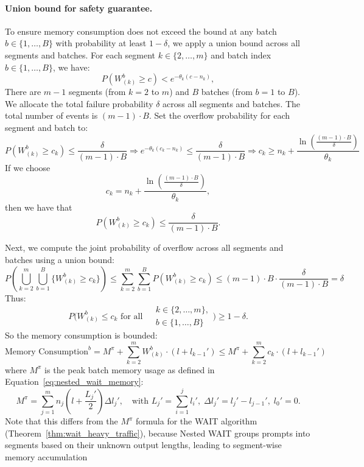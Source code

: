 \paragraph{Union bound for safety guarantee.}
To ensure memory consumption does not exceed the bound at any batch $b \in \{1, \dots, B\}$ with probability at least \( 1 - \delta \), we apply a union bound across all segments and batches. For each segment \( k \in \{2, \dots, m\} \) and batch index \( b \in \{1, \dots, B\} \), we have:
\[ P\left( W^b_{(k)} \geq c \right) < e^{-\theta_k (c - n_k)}, \]
There are \( m - 1 \) segments (from \( k = 2 \) to \( m \)) and \( B \) batches (from \( b = 1 \) to \( B \)). We allocate the total failure probability \( \delta \) across all segments and batches. The total number of events is \( (m - 1) \cdot B \). Set the overflow probability for each segment and batch to:
$$P\left( W^b_{(k)} \geq c_k \right) \leq \frac{\delta}{(m - 1) \cdot B}\Rightarrow e^{-\theta_k (c_k - n_k)} \leq \frac{\delta}{(m - 1) \cdot B}\Rightarrow c_k \geq n_k + \frac{\ln\left( \frac{(m - 1) \cdot B}{\delta} \right)}{\theta_k}$$
If we choose
\[ c_k = n_k + \frac{\ln\left( \frac{(m - 1) \cdot B}{\delta} \right)}{\theta_k}, \]
then we have that
\[ P\left( W^b_{(k)} \geq c_k \right) \leq \frac{\delta}{(m - 1) \cdot B}. \]

Next, we compute the joint probability of overflow across all segments and batches using a union bound:
$$P\left( \bigcup_{k=2}^m \bigcup_{b=1}^B \{ W^b_{(k)} \geq c_k \} \right) \leq \sum_{k=2}^m \sum_{b=1}^B P\left( W^b_{(k)} \geq c_k \right)\leq (m - 1) \cdot B \cdot \frac{\delta}{(m - 1) \cdot B} = \delta$$
Thus:
$$P\bigg( W^b_{(k)} \leq c_k \text{ for all }
\begin{aligned}
    &k \in \{2, \dots, m\}, \\
    &b \in \{1, \dots, B\}
\end{aligned} \bigg)
\geq 1 - \delta.$$
So the memory consumption is bounded:
$$    \text{Memory Consumption}^b
= M^{\pi} + \sum_{k=2}^m W^b_{(k)} \cdot (l + l_{k-1}')\leq M^{\pi} + \sum_{k=2}^m c_k \cdot (l + l_{k-1}')$$
where $M^\pi$ is the peak batch memory usage as defined in Equation~\eqref{eq:nested_wait_memory}:
$$M^\pi = \sum_{j=1}^m n_j \left( l + \frac{L_j'}{2} \right) \Delta l_j', \quad \text{with } L_j' = \sum_{i=1}^j l_i',\; \Delta l_j' = l_j' - l_{j-1}',\; l_0' = 0.$$
Note that this differs from the $M^\pi$ formula for the WAIT algorithm (Theorem~\ref{thm:wait_heavy_traffic}), because Nested WAIT groups prompts into segments based on their unknown output lengths, leading to segment-wise memory accumulation

